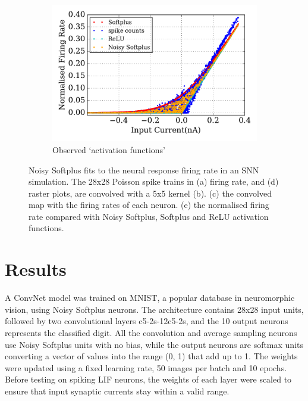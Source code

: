 \begin{figure}[bt!]
		\begin{subfigure}[t]{0.4\textwidth}
			\includegraphics[width=\textwidth]{pics_iconip/6-5.pdf}
		    \caption{Observed `activation functions'}
		    \label{Fig:65}
		\end{subfigure}
		\caption{
			Noisy Softplus fits to the neural response firing rate in an SNN simulation.
			The 28x28 Poisson spike trains in (a) firing rate, and (d) raster plots, are convolved with a 5x5 kernel (b).
			(c) the convolved map with the firing rates of each neuron.
			(e) the normalised firing rate compared with Noisy Softplus, Softplus and ReLU activation functions.}
		\label{fig:cnn}
	\end{figure}
\section{Results}
	A ConvNet model was trained on MNIST,
	a popular database in neuromorphic vision, using Noisy Softplus neurons.
	The architecture contains 28x28 input units, followed by two convolutional layers c5-2s-12c5-2s, and the 10 output neurons represents the classified digit.
	All the convolution and average sampling neurons use Noisy Softplus units with no bias, while the output neurons are softmax units converting a vector of values into the range (0, 1) that add up to 1.
	The weights were updated using a fixed learning rate, 50 images per batch and 10 epochs.
	Before testing on spiking LIF neurons, the weights of each layer were scaled to ensure that input synaptic currents stay within a valid range.
	
